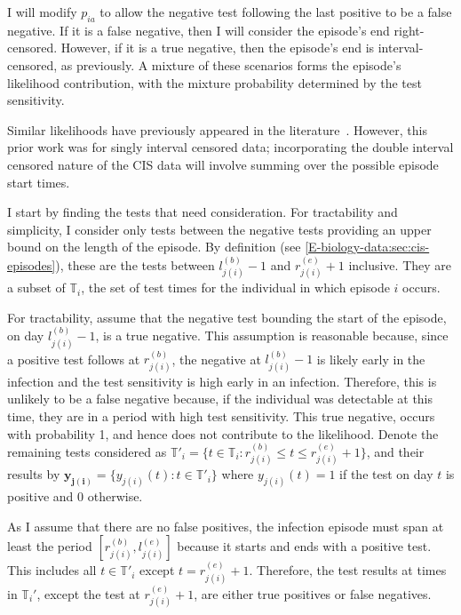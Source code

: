 \documentclass[12pt, letterpaper]{article} %
\renewcommand{\vec}{\bm}
\newcommand{\ssep}{:}
\newcommand{\sched}{\mathbb{T}}
\begin{document}
I will modify $p_{ia}$ to allow the negative test following the last positive to be a false negative.
If it is a false negative, then I will consider the episode's end right-censored.
However, if it is a true negative, then the episode's end is interval-censored, as previously.
A mixture of these scenarios forms the episode's likelihood contribution, with the mixture probability determined by the test sensitivity.

Similar likelihoods have previously appeared in the literature~\autocite[e.g.][eq.\ (2)]{piresIntervalMisclassify}.
However, this prior work was for singly interval censored data; incorporating the double interval censored nature of the CIS data will involve summing over the possible episode start times.

I start by finding the tests that need consideration.
For tractability and simplicity, I consider only tests between the negative tests providing an upper bound on the length of the episode.
By definition (see \cref{E-biology-data:sec:cis-episodes}), these are the tests between $l_{j(i)}^{(b)} - 1$ and $r_{j(i)}^{(e)} + 1$ inclusive.
They are a subset of $\sched_i$, the set of test times for the individual in which episode $i$ occurs.

For tractability, assume that the negative test bounding the start of the episode, on day $l_{j(i)}^{(b)}-1$, is a true negative.
This assumption is reasonable because, since a positive test follows at $r_{j(i)}^{(b)}$, the negative at $l_{j(i)}^{(b)}-1$ is likely early in the infection and the test sensitivity is high early in an infection.
Therefore, this is unlikely to be a false negative because, if the individual was detectable at this time, they are in a period with high test sensitivity.
This true negative, occurs with probability 1, and hence does not contribute to the likelihood.
Denote the remaining tests considered as $\sched'_i = \{ t \in \sched_i \ssep r_{j(i)}^{(b)} \leq t \leq r_{j(i)}^{(e)} + 1 \}$, and their results by $\vec{y_{j(i)}} = \{ y_{j(i)}(t) \ssep t \in \sched'_i \}$ where $y_{j(i)}(t) = 1$ if the test on day $t$ is positive and 0 otherwise.

As I assume that there are no false positives, the infection episode must span at least the period $[r^{(b)}_{j(i)}, l^{(e)}_{j(i)}]$ because it starts and ends with a positive test.
This includes all $t \in \sched'_i$ except $t = r_{j(i)}^{(e)}+1$.
Therefore, the test results at times in $\sched_i'$, except the test at $r_{j(i)}^{(e)}+1$, are either true positives or false negatives.
\end{document}
